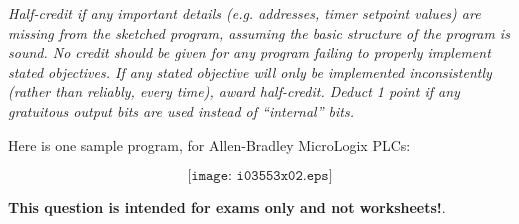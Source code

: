 
{\it Half-credit if any important details (e.g. addresses, timer setpoint values) are missing from the sketched program, assuming the basic structure of the program is sound.  No credit should be given for any program failing to properly implement  stated objectives.  If any stated objective will only be implemented inconsistently (rather than reliably, every time), award half-credit.  Deduct 1 point if any gratuitous output bits are used instead of ``internal'' bits.}

\vskip 10pt

Here is one sample program, for Allen-Bradley MicroLogix PLCs:

$$\texttt{[image: i03553x02.eps]}$$







{\bf This question is intended for exams only and not worksheets!}.


